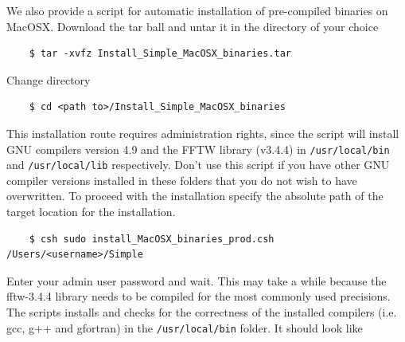 \documentclass[a4paper,11pt]{article}
\begin{document}
We also provide a script for automatic installation of pre-compiled binaries on MacOSX. Download the tar ball and untar it in the directory of your choice 
\begin{verbatim}
    $ tar -xvfz Install_Simple_MacOSX_binaries.tar
\end{verbatim}
Change directory 
\begin{verbatim}
    $ cd <path to>/Install_Simple_MacOSX_binaries
\end{verbatim}
This installation route requires administration rights, since the script will install GNU compilers version 4.9 and the FFTW library (v3.4.4) in \texttt{/usr/local/bin} and \texttt{/usr/local/lib} respectively. Don't use this script if you have other GNU compiler versions installed in these folders that you do not wish to have overwritten. To proceed with the installation specify the absolute path of the target location for the installation.
\begin{verbatim}
    $ csh sudo install_MacOSX_binaries_prod.csh /Users/<username>/Simple
\end{verbatim}
Enter your admin user password and wait. This may take a while because the fftw-3.4.4 library needs to be compiled for the most commonly used precisions. The scripts installs and checks for the correctness of the installed compilers (i.e. gcc, g++ and gfortran) in the \texttt{/usr/local/bin} folder. It
should look like
\end{document}
